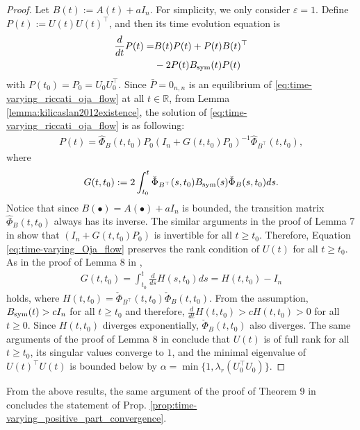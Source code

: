 \documentclass[fleqn,10pt]{SICE_FES26}
\begin{document}
    \begin{proof}
    Let $B(t) := A (t) + aI_{n}$. 
    For simplicity, we only consider $\varepsilon =1$. 
    Define $P(t) := U(t) U(t)^{\top}$, and then its time evolution equation is
    \begin{align}
    \frac{d}{dt} P(t) = & B (t) P(t) + P(t) B(t)^{\top} \nonumber
    \\ & 
    - 2 P(t) B_{\rm sym}(t) P(t) 
    \label{eq:time-varying_riccati_oja_flow}
    \end{align}
    with $P(t_{0}) = P_{0} = U_{0} U_{0} ^{\top}$. 
    Since $ \bar{P}= 0_{n,n}$ is an equilibrium of \eqref{eq:time-varying_riccati_oja_flow} at all $t \in \mathbb{R}$, from Lemma \ref{lemma:kilicaslan2012existence}, the solution of \eqref{eq:time-varying_riccati_oja_flow} is as following: 
    \begin{align*}
    P(t) = \hat{\Phi }_{B}(t,t_{0}) P_{0} 
    (I_{n} + G(t,t_{0}) P_{0}) ^{-1}
    \hat{\Phi}_{B^{\top}}(t,t_{0})  ,
    \end{align*}
    where 
    \begin{align*}
    G(t,t_{0}) :=   2 \int _{t_{0}}^{t} \check{\Phi}_{B^{\top}} (s,t_{0})  B_{\rm sym}(s) \check{\Phi}_{B}(s, t_{0}) ds 
    .
    \end{align*}
    Notice that since $B(\bullet ) = A(\bullet ) + aI_{n}$ is bounded, the transition matrix $\hat{\Phi} _{B} (t,t_{0})$ always has its inverse. 
    The similar arguments in the proof of Lemma 7 in \cite{TsuzukiOhki2025global} show that $ ( I_{n} + G(t,t_{0}) P_{0} )$ is invertible for all $t \geq t_{0}$. 
    Therefore, Equation \eqref{eq:time-varying_Oja_flow} preserves the rank condition of $U(t)$ for all $t \geq t_{0}$. 
    As in the proof of Lemma 8 in \cite{TsuzukiOhki2025global}, 
    \begin{align*}
    G(t,t_{0}) = \int_{t_{0}}^{t} \frac{d}{ds}H(s,t_{0}) ds = H(t,t_{0}) - I_{n}
    \end{align*}
    holds, where $H(t,t_{0}) = \check{\Phi}_{B^{\top}} (t,t_{0}) \check{\Phi}_{B} (t,t_{0})$.  
    From the assumption, $B_{\rm sym}(t) > cI_{n}$ for all $t\geq t_{0}$ and therefore, $\frac{d}{dt} H(t,t_{0}) > c H(t,t_{0}) > 0$ for all $t\geq 0$. 
    Since $H(t,t_{0})$ diverges exponentially, $\check{\Phi}_{B} (t,t_{0})$ also diverges. 
    The same arguments of the proof of Lemma 8 in \cite{TsuzukiOhki2025global} conclude that $U(t)$ is of full rank for all $t\geq t_0$, its singular values converge to $1$, and the minimal eigenvalue of $U(t)^{\top}U(t)$ is bounded below by $\alpha = \min \{ 1, \lambda _{r} (U_{0}^{\top}U_{0}) \}$. 
    \end{proof}
	
	
	From the above results, the same argument of the proof of Theorem 9 in \cite{TsuzukiOhki2025global} concludes the statement of Prop. \ref{prop:time-varying_positive_part_convergence}. 
\end{document}
